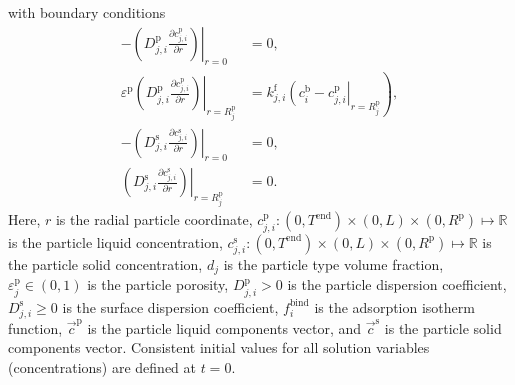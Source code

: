 \documentclass{article}
\begin{document}
with boundary conditions
\begin{align}
- \left. \left( D^{\mathrm{p}}_{j,i} \frac{\partial c^{\mathrm{p}}_{j,i}}{\partial r} \right) \right|_{r=0}
&= 0, \\
\varepsilon^{\mathrm{p}} \left. \left( D^{\mathrm{p}}_{j,i} \frac{\partial c^{\mathrm{p}}_{j,i}}{\partial r} \right)\right|_{r = R^{\mathrm{p}}_{j}}
               &= k^{\mathrm{f}}_{j,i} \left. \left( c^{\mathrm{b}}_i - c^{\mathrm{p}}_{j,i} \right|_{r = R^{\mathrm{p}}_{j}} \right),\\
-\left( \left. D^{\mathrm{s}}_{j,i} \frac{\partial c^{\mathrm{s}}_{j,i}}{\partial r} \right) \right|_{r=0}
&= 0, \\
\left( \left. D^{\mathrm{s}}_{j,i} \frac{\partial c^{\mathrm{s}}_{j,i}}{\partial r} \right) \right|_{r = R^{\mathrm{p}}_{j}}
&= 0.
\end{align}
Here, $r$ is the radial particle coordinate, $c^{\mathrm{p}}_{j,i}\colon  (0, T^\mathrm{end}) \times (0, L)\times (0, R^{\mathrm{p}}) \mapsto \mathbb{R}$ is the particle liquid concentration, $c^{\mathrm{s}}_{j,i}\colon  (0, T^\mathrm{end}) \times (0, L)\times (0, R^{\mathrm{p}}) \mapsto \mathbb{R}$ is the particle solid concentration, $d_j$ is the particle type volume fraction, $\varepsilon^{\mathrm{p}}_{j}\in (0, 1)$ is the particle porosity, $D^\mathrm{p}_{j,i}> 0$ is the particle dispersion coefficient, $D^\mathrm{s}_{j,i}\geq 0$ is the surface dispersion coefficient, $f^\mathrm{bind}_{i}$ is the adsorption isotherm function, $\vec{c}^\mathrm{p}$ is the particle liquid components vector, and $\vec{c}^\mathrm{s}$ is the particle solid components vector.
Consistent initial values for all solution variables (concentrations) are defined at $t = 0$.
\end{document}
